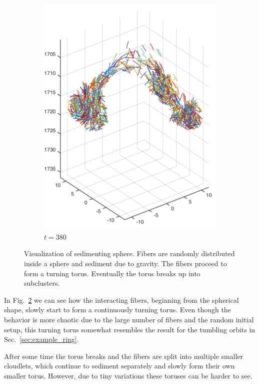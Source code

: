 \begin{figure}[!htbp]
\begin{subfigure}[h]{0.4\textwidth}
    \includegraphics[width=\textwidth]{img/state_00380.pdf}
    \caption{$t=380$}\label{fig:sphere_simulation_1d}
  \end{subfigure}
  \caption[Visualization of sedimenting sphere.]{Visualization of sedimenting sphere. Fibers are randomly distributed inside a sphere and sediment due to gravity. The fibers proceed to form a turning torus. Eventually the torus breaks up into subclusters.}
  \label{fig:sphere_simulation}
\end{figure}

In Fig.~\ref{fig:sphere_simulation} we can see how the interacting fibers, beginning from the spherical shape, slowly start to form a continuously turning torus. Even though the behavior is more chaotic due to the large number of fibers and the random initial setup, this turning torus somewhat resembles the result for the tumbling orbits in Sec.~\ref{sec:example_ring}.

After some time the torus breaks and the fibers are split into multiple smaller cloudlets, which continue to sediment separately and slowly form their own smaller torus. However, due to tiny variations these toruses can be harder to see. 

